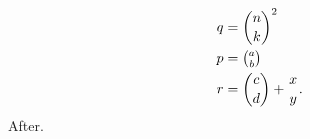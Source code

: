 \documentclass{article}
\renewcommand{\atop}[2]{\genfrac{}{}{0pt}{}{#1}{#2}}
\begin{document}
\begin{equation}
\begin{split}
q&=\binom{n}{k}^2 \\
p&=\tbinom{a}{b} \\
r&=\dbinom{c}{d}+\atop{x}{y}.
\end{split}
\end{equation}
After.
\end{document}

